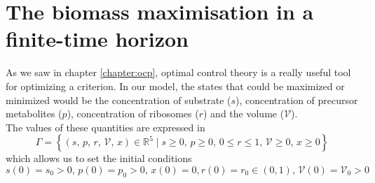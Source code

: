\documentclass{tudelft-report}
\begin{document}
\chapter{The biomass maximisation in a finite-time horizon}
\label{chapter:bm-ocp}
As we saw in chapter \ref{chapter:ocp}, optimal control theory is a really useful tool for optimizing a criterion. In our model, the states that could be maximized or minimized would be the concentration of substrate ($s$), concentration of precursor metabolites ($p$), concentration of ribosomes ($r$) and the volume ($\mathcal{V}$).\\
The values of these quantities are expressed in 
\begin{equation*}\Gamma = \left\{(s,\, p,\, r,\, \mathcal{V},\, x)\in\mathbb{R}^5 \mid s\geq 0,\, p\geq 0,\, 0\leq r\leq 1,\, \mathcal{V}\geq 0,\, x\geq 0 \right\}
\end{equation*}\noindent
 which allows us to set the initial conditions
\begin{equation*}\tag{IC}\label{eq:ic}
s(0) = s_0 >0,\, p(0) = p_0 >0,\, x(0) = 0, r(0) = r_0 \in (0,1),\, \mathcal{V}(0) = \mathcal{V}_0>0
\end{equation*}\noindent
{}
\end{document}
